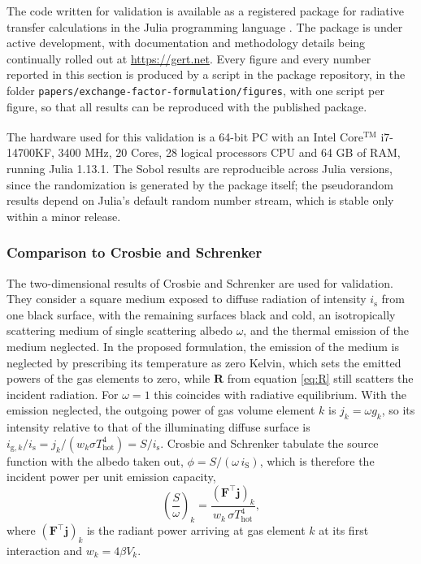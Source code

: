 \documentclass[preprint,1p,times]{elsarticle}
\theoremstyle{plain}
\theoremstyle{definition}
\theoremstyle{remark}
\begin{document}
The code written for validation is available as a registered package for radiative transfer calculations in the Julia programming language \citep{Bielefeld2024}. The package is under active development, with documentation and methodology details being continually rolled out at \url{https://gert.net}. Every figure and every number reported in this section is produced by a script in the package repository, in the folder \texttt{papers/exchange-factor-formulation/figures}, with one script per figure, so that all results can be reproduced with the published package.

The hardware used for this validation is a 64-bit PC with an Intel\textsuperscript{\tiny\textregistered} Core$^\mathrm{TM}$ i7-14700KF, 3400 MHz, 20 Cores, 28 logical processors CPU and 64 GB of RAM, running Julia 1.13.1. The Sobol results are reproducible across Julia versions, since the randomization is generated by the package itself; the pseudorandom results depend on Julia's default random number stream, which is stable only within a minor release.

\subsubsection{Comparison to Crosbie and Schrenker}
\label{sec:Crosbie_Schrenker}

The two-dimensional results of Crosbie and Schrenker \citep{Crosbie1984} are used for validation. They consider a square medium exposed to diffuse radiation of intensity $i_\mathrm{s}$ from one black surface, with the remaining surfaces black and cold, an isotropically scattering medium of single scattering albedo $\omega$, and the thermal emission of the medium neglected. In the proposed formulation, the emission of the medium is neglected by prescribing its temperature as zero Kelvin, which sets the emitted powers of the gas elements to zero, while $\mathbf{R}$ from equation \eqref{eq:R} still scatters the incident radiation. For $\omega = 1$ this coincides with radiative equilibrium. With the emission neglected, the outgoing power of gas volume element $k$ is $j_k = \omega g_k$, so its intensity relative to that of the illuminating diffuse surface is $i_{\mathrm{g},k}/i_\mathrm{s} = j_k/(w_k \sigma T_\mathrm{hot}^4) = S/i_\mathrm{s}$. Crosbie and Schrenker tabulate the source function with the albedo taken out, $\phi = S/(\omega\, i_\mathrm{S})$, which is therefore the incident power per unit emission capacity,
\begin{equation}
	\left(\frac{S}{\omega}\right)_k = \frac{(\mathbf{F}^\top \mathbf{j})_k}{w_k\, \sigma T_\mathrm{hot}^4},
	\label{eq:crosbie_compare}
\end{equation}
where $(\mathbf{F}^\top \mathbf{j})_k$ is the radiant power arriving at gas element $k$ at its first interaction and $w_k = 4\beta V_k$.
\end{document}
